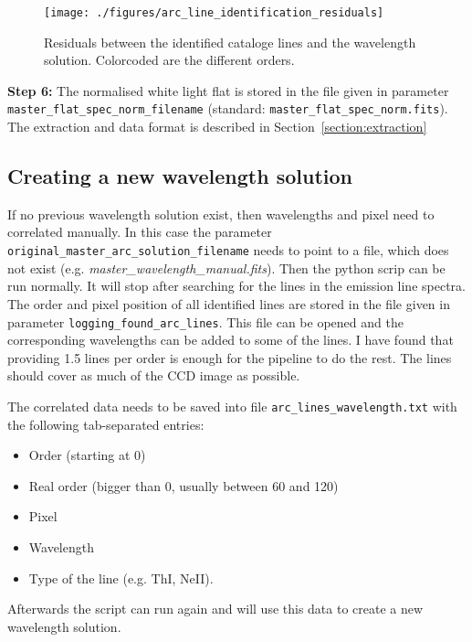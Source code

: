 \documentclass[10pt,a4paper]{article}
\begin{document}
\begin{figure} 
  \begin{center}
    \texttt{[image: ./figures/arc\_line\_identification\_residuals]}
  \end{center} 
  \caption{Residuals between the identified cataloge lines and the wavelength solution. Colorcoded are the different orders.
    \label{figure_arc_line_identification_residuals}}
\end{figure}

\noindent \textbf{Step 6:} The normalised white light flat is stored in the file given in parameter \verb|master_flat_spec_norm_filename| (standard: \verb|master_flat_spec_norm.fits|). The extraction and data format is described in Section~\ref{section:extraction}

\subsection{Creating a new wavelength solution}
\label{section:create_new_wave_solution}
If no previous wavelength solution exist, then wavelengths and pixel need to correlated manually. In this case the parameter \verb|original_master_arc_solution_filename| needs to point to a file, which does not exist (e.g. \textit{master\_wavelength\_manual.fits}). Then the python scrip can be run normally. It will stop after searching for the lines in the emission line spectra. The order and pixel position of all identified lines are stored in the file given in parameter \verb|logging_found_arc_lines|. This file can be opened and the corresponding wavelengths can be added to some of the lines. I have found that providing 1.5 lines per order is enough for the pipeline to do the rest. The lines should cover as much of the CCD image as possible.

The correlated data needs to be saved into file \verb|arc_lines_wavelength.txt| with the following tab-separated entries:
\begin{itemize}
  \item Order (starting at 0)
  \item Real order (bigger than 0, usually between 60 and 120)
  \item Pixel
  \item Wavelength
  \item Type of the line (e.g. ThI, NeII).
\end{itemize}

Afterwards the script can run again and will use this data to create a new wavelength solution.
\end{document}

